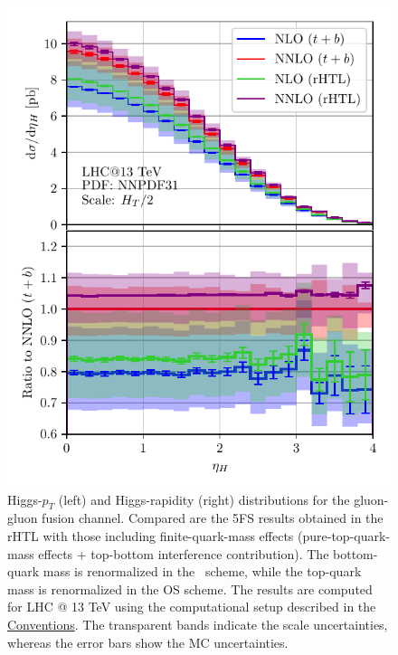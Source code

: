 \begin{figure}[ht]
\begin{minipage}[t]{0.49\textwidth}
  \includegraphics[width=\textwidth]{Images/yH_13000_bMS_tOS_cropped.pdf}
\end{minipage}
\caption{Higgs-$p_T$ (left) and Higgs-rapidity (right) distributions for the gluon-gluon fusion channel. Compared are the 5\acs{FS} results obtained in the \acs{rHTL} with those including finite-quark-mass effects (pure-top-quark-mass effects + top-bottom interference contribution). The bottom-quark mass is renormalized in the \MS\ scheme, while the top-quark mass is renormalized in the \acs{OS} scheme. The results are computed for LHC @ 13 TeV using the computational setup described in the \hyperref[chap:notation_and_conventions]{Conventions}. The transparent bands indicate the scale uncertainties, whereas the error bars show the \acs{MC} uncertainties.}
\label{fig:6:pT_yH_distributions}
\end{figure}
